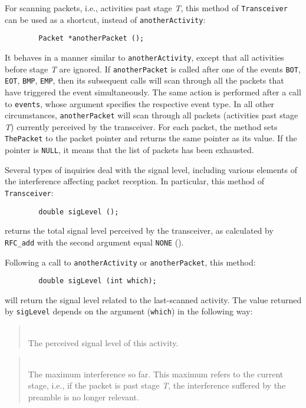 For scanning packets, i.e., activities past stage {\em T}, this method of
{\tt Transceiver} can be
used as a shortcut, instead of {\tt anotherActivity}:
\begin{verbatim}
        Packet *anotherPacket ();
\end{verbatim}
It behaves in a manner similar to {\tt anotherActivity}, except that all
activities before stage {\em T\/} are ignored.
If {\tt anotherPacket} is called after one of the events
{\tt BOT}, {\tt EOT}, {\tt BMP}, {\tt EMP},
then its subsequent calls will scan through all the packets that have
triggered the event simultaneously.
The same action is performed after a call to {\tt events}, whose argument
specifies the respective event type.
In all other circumstances, {\tt anotherPacket} will scan through all packets
(activities past stage {\em T\/}) currently perceived by the
transceiver.
For each packet, the method sets {\tt ThePacket} to the packet pointer and
returns the same pointer as its value.
If the pointer is {\tt NULL}, it means that the list of
packets has been exhausted.

Several types of inquiries deal with the signal level, including various
elements of the interference affecting packet reception.
In particular, this method of {\tt Transceiver}:
\begin{verbatim}
        double sigLevel ();
\end{verbatim}
\noindent
returns the total signal level perceived by the transceiver, as calculated
by {\tt RFC\_add} with the second argument equal {\tt NONE}
().

Following a call to {\tt anotherActivity} or {\tt anotherPacket}, this method:
\begin{verbatim}
        double sigLevel (int which);
\end{verbatim}
\noindent
will return the signal level related to the last-scanned activity.
The value returned by {\tt sigLevel} depends on the argument 
({\tt which}) in the following way:

\begin{quote}
\noindent{}\\ \hspace{0in}
The perceived signal level of this activity.
\end{quote}

\begin{quote}
\noindent{}\\ \hspace{0in}
The maximum interference so far.
This maximum refers to the current stage, i.e.,
if the packet is past stage {\em T}, the interference suffered
by the preamble is no longer relevant.
\end{quote}

